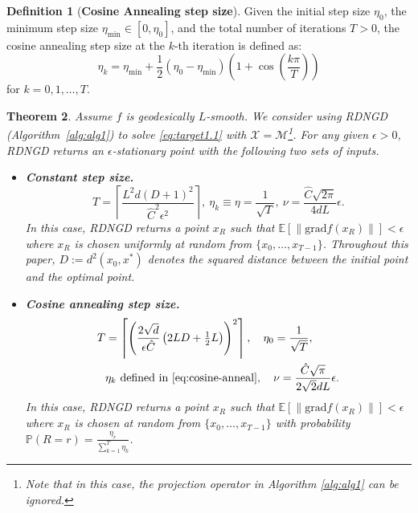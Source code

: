 \documentclass{article}
\newcommand{\rgrad}{\mathrm{grad}}
\newcommand{\pert}{\nu}
\theoremstyle{plain}
\newtheorem{theorem}{Theorem}[section]
\theoremstyle{definition}
\newtheorem{definition}[theorem]{Definition}
\theoremstyle{remark}
\begin{document}
\begin{definition}[\bf Cosine Annealing step size]\label{def:cosine_annealing_step size}
Given the initial step size $\eta_0$, the minimum step size $\eta_{\min}\in [0,\eta_0]$, and the total number of iterations $T>0$, the cosine annealing step size at the $k$-th iteration is defined as:
\begin{equation}\label{eq:cosine-anneal}
\eta_k = \eta_{\min} + \frac{1}{2}(\eta_{0}-\eta_{\min})\left(1+\cos\left(\frac{k\pi}{T}\right)\right)
\end{equation}
for $k=0,1,\ldots,T$.
\end{definition}

\begin{theorem}\label{thm:beta_smoothness_complexityapp}
Assume $f$ is geodesically $L$-smooth. We consider using RDNGD (Algorithm~\ref{alg:alg1}) to solve \eqref{eq:target1.1} with $\mathcal{X}=\mathcal{M}$\footnote{Note that in this case, the projection operator in Algorithm \ref{alg:alg1} can be ignored.}. For any given $\epsilon>0$, RDNGD returns an $\epsilon$-stationary point with the following two sets of inputs. 
\vspace{-0.05in}
\begin{itemize}[leftmargin=*]
\item[(i)] \textbf{Constant step size.}
\[    T = \left\lceil \frac{L^2d(D+1)^2}{\hat{C}^2\epsilon^2} \right\rceil,\
    \eta_k\equiv \eta=\frac{1}{\sqrt{T}}, \
    \pert = \frac{\hat{C}\sqrt{2\pi}}{4dL}\epsilon.
\]
In this case, RDNGD returns a point $x_R$ such that $\mathbb{E}[\|\rgrad f(x_R)\|] < \epsilon$
where $x_R$ is chosen uniformly at random from $\{x_0, \dots, x_{T-1}\}$. %
 Throughout this paper, $D:= d^2(x_0,x^*)$ denotes the squared distance between the initial point and the optimal point. 

\item[(ii)] \textbf{Cosine annealing step size.}
\begin{equation}\label{thm:beta_smoothness_complexityapp-cosine-parameter}
\begin{split}
    T &= \left\lceil \left( \frac{2\sqrt{d}}{\epsilon \hat{C}} \left( 2L D + \tfrac{1}{2}L \right) \right)^{2} \right\rceil,\quad \eta_0 = \frac{1}{\sqrt{T}},\\
    &\eta_k \text{ defined in } \eqref{eq:cosine-anneal}, \quad
    \pert = \frac{\hat{C}\sqrt{\pi}}{2\sqrt{2}dL}\epsilon.
\end{split}
\end{equation}
In this case, RDNGD returns a point $x_R$ such that $\mathbb{E}[\|\rgrad f(x_R)\|] < \epsilon$
where $x_R$ is chosen at random from $\{x_0, \dots, x_{T-1}\}$ with probability $\mathbb{P}(R=r)=\frac{\eta_r}{\sum_{k=1}^T\eta_k}$.
\end{itemize}
\end{theorem}
\end{document}
